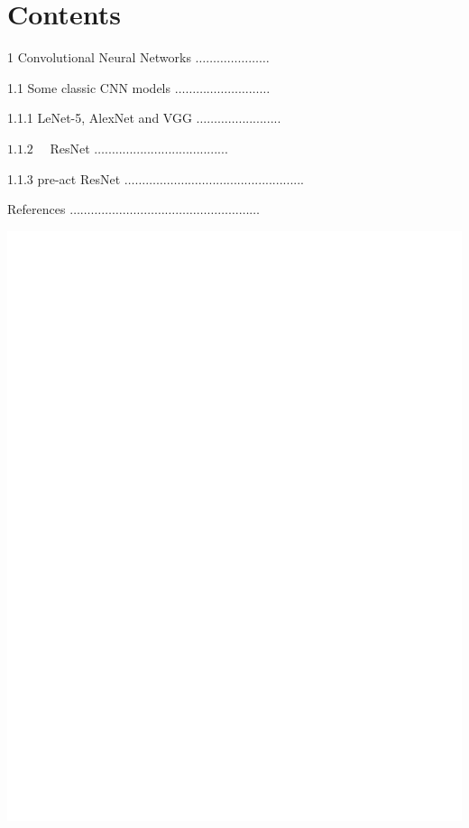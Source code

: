 \documentclass[10pt]{article}
\begin{document}
\section{Contents}
1 Convolutional Neural Networks $\ldots \ldots \ldots \ldots \ldots \ldots \ldots$

1.1 Some classic CNN models $\ldots \ldots \ldots \ldots \ldots \ldots \ldots \ldots \ldots$

1.1.1 LeNet-5, AlexNet and VGG $\ldots \ldots \ldots \ldots . . . . . . . . . . . .$

$1.1 .2 \quad$ ResNet $\ldots . \ldots . . . . . . . . . . . . . . . . . . . . . . . . . . . . . . .$

1.1.3 pre-act ResNet $\ldots \ldots \ldots \ldots \ldots \ldots \ldots \ldots . . . . . . . . . . . . . . . . . . . . . . . . . . .$

References $\ldots \ldots \ldots \ldots \ldots \ldots \ldots \ldots \ldots \ldots \ldots \ldots \ldots \ldots \ldots \ldots \ldots \ldots$

\includegraphics[max width=\textwidth]{2022_01_06_73aade67e8906ae5893fg-2}
\end{document}
